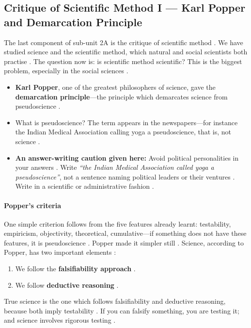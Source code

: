 \subsection{Critique of Scientific Method I --- Karl Popper and Demarcation Principle}
The last component of sub-unit 2A is the critique of scientific method . We have studied science and the scientific method, which natural and social scientists both practise . The question now is: is scientific method scientific? This is the biggest problem, especially in the social sciences .
\begin{itemize}
    \item \textbf{Karl Popper}, one of the greatest philosophers of science, gave the \textbf{demarcation principle}---the principle which demarcates science from pseudoscience .
\end{itemize}

\begin{CriticalPoint}
\begin{itemize}
    \item What is pseudoscience? The term appears in the newspapers---for instance the Indian Medical Association calling yoga a pseudoscience, that is, not science .
    \item \textbf{An answer-writing caution given here:} Avoid political personalities in your answers . Write \textit{``the Indian Medical Association called yoga a pseudoscience''}, not a sentence naming political leaders or their ventures . Write in a scientific or administrative fashion .
\end{itemize}
\end{CriticalPoint}

\paragraph{Popper's criteria}
One simple criterion follows from the five features already learnt: testability, empiricism, objectivity, theoretical, cumulative---if something does not have these features, it is pseudoscience . Popper made it simpler still . Science, according to Popper, has two important elements :
\begin{enumerate}
    \item We follow the \textbf{falsifiability approach} .
    \item We follow \textbf{deductive reasoning} .
\end{enumerate}
True science is the one which follows falsifiability and deductive reasoning, because both imply testability . If you can falsify something, you are testing it; and science involves rigorous testing .

